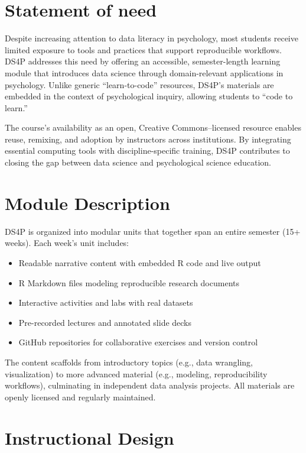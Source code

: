 \documentclass[10pt,a4paper,onecolumn]{article}
\providecommand{\tightlist}{%
  \setlength{\itemsep}{0pt}\setlength{\parskip}{0pt}}
\begin{document}
\section{Statement of need}\label{statement-of-need}

Despite increasing attention to data literacy in psychology, most
students receive limited exposure to tools and practices that support
reproducible workflows. DS4P addresses this need by offering an
accessible, semester-length learning module that introduces data science
through domain-relevant applications in psychology. Unlike generic
``learn-to-code'' resources, DS4P's materials are embedded in the
context of psychological inquiry, allowing students to ``code to
learn.''

The course's availability as an open, Creative Commons--licensed
resource enables reuse, remixing, and adoption by instructors across
institutions. By integrating essential computing tools with
discipline-specific training, DS4P contributes to closing the gap
between data science and psychological science education.

\section{Module Description}\label{module-description}

DS4P is organized into modular units that together span an entire
semester (15+ weeks). Each week's unit includes:

\begin{itemize}
\tightlist
\item
  Readable narrative content with embedded R code and live output
\item
  R Markdown files modeling reproducible research documents
\item
  Interactive activities and labs with real datasets
\item
  Pre-recorded lectures and annotated slide decks
\item
  GitHub repositories for collaborative exercises and version control
\end{itemize}

The content scaffolds from introductory topics (e.g., data wrangling,
visualization) to more advanced material (e.g., modeling,
reproducibility workflows), culminating in independent data analysis
projects. All materials are openly licensed and regularly maintained.

\section{Instructional Design}\label{instructional-design}
\end{document}
